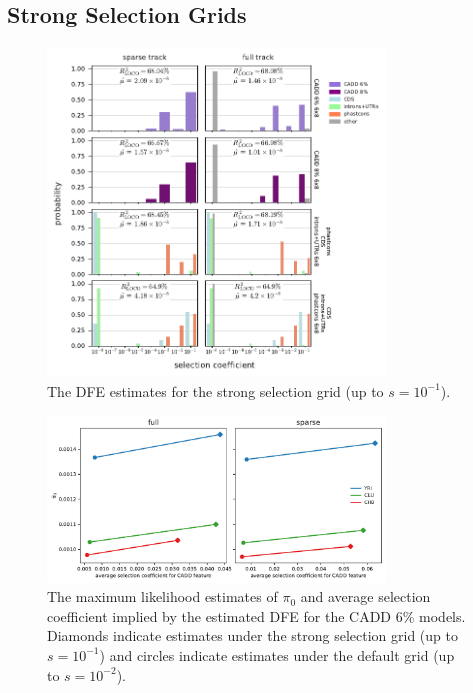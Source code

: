 \documentclass[11pt]{article}
\begin{document}
\subsection{Strong Selection Grids}
\label{supp:strong-sel-grid}

\begin{figure}[htbp]
    \label{suppfig:strong-sel-dfe}
  \centering
  \includegraphics[width=0.8\textwidth]{figures/supplementary/strongsel_grid_dfe.pdf}
  \caption{The DFE estimates for the strong selection grid (up to $s=10^{-1}$).}
\end{figure}



\begin{figure}[htbp]
    \label{suppfig:sel-ident}
  \centering
  \includegraphics[width=0.8\textwidth]{figures/supplementary/ave_sel_vs_pi0.pdf}

  \caption{The maximum likelihood estimates of $\pi_0$ and average selection
  coefficient implied by the estimated DFE for the CADD 6\% models. Diamonds
indicate estimates under the strong selection grid (up to $s=10^{-1}$) and
circles indicate estimates under the default grid (up to $s=10^{-2}$).}

\end{figure}
\end{document}
